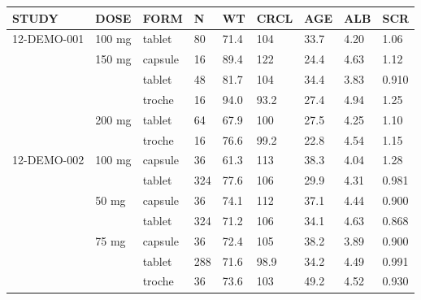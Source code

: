 \setlength{\tabcolsep}{5pt} 
\begin{threeparttable}
\renewcommand{\arraystretch}{1.3}
\begin{tabular}[h]{lllllllll}
\hline
STUDY & DOSE & FORM & N & WT & CRCL & AGE & ALB & SCR \\
\hline
12-DEMO-001 & 100 mg & tablet & 80 & 71.4 & 104 & 33.7 & 4.20 & 1.06 \\
 & 150 mg & capsule & 16 & 89.4 & 122 & 24.4 & 4.63 & 1.12 \\
 &  & tablet & 48 & 81.7 & 104 & 34.4 & 3.83 & 0.910 \\
 &  & troche & 16 & 94.0 & 93.2 & 27.4 & 4.94 & 1.25 \\
 & 200 mg & tablet & 64 & 67.9 & 100 & 27.5 & 4.25 & 1.10 \\
 &  & troche & 16 & 76.6 & 99.2 & 22.8 & 4.54 & 1.15 \\
12-DEMO-002 & 100 mg & capsule & 36 & 61.3 & 113 & 38.3 & 4.04 & 1.28 \\
 &  & tablet & 324 & 77.6 & 106 & 29.9 & 4.31 & 0.981 \\
 & 50 mg & capsule & 36 & 74.1 & 112 & 37.1 & 4.44 & 0.900 \\
 &  & tablet & 324 & 71.2 & 106 & 34.1 & 4.63 & 0.868 \\
 & 75 mg & capsule & 36 & 72.4 & 105 & 38.2 & 3.89 & 0.900 \\
 &  & tablet & 288 & 71.6 & 98.9 & 34.2 & 4.49 & 0.991 \\
 &  & troche & 36 & 73.6 & 103 & 49.2 & 4.52 & 0.930 \\
\hline
\end{tabular}
\end{threeparttable}
